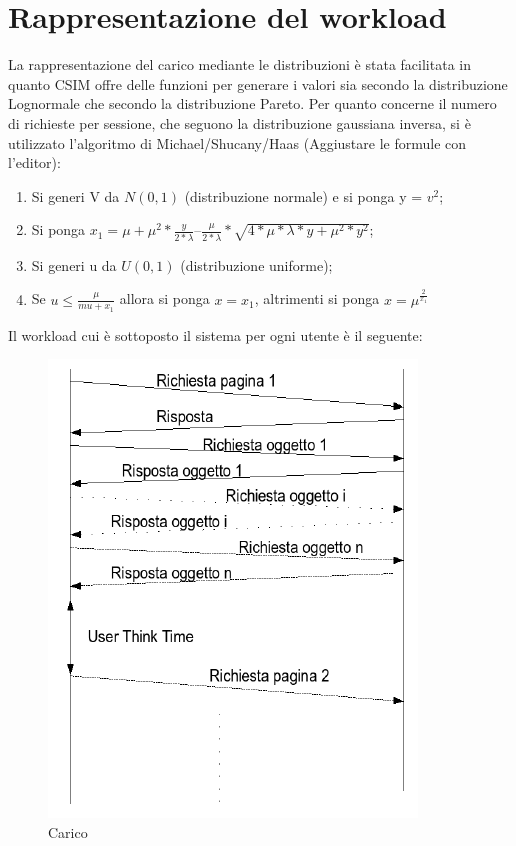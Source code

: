 \section{Rappresentazione del workload}
La rappresentazione del carico mediante le distribuzioni è stata facilitata in quanto CSIM offre delle funzioni per generare i valori sia secondo la distribuzione Lognormale  che secondo la distribuzione Pareto. Per quanto concerne il numero di richieste per sessione, che seguono la distribuzione gaussiana inversa, si è utilizzato l'algoritmo di Michael/Shucany/Haas (Aggiustare le formule con l'editor):
\begin{enumerate}
	\item Si generi V da $N(0,1)$ (distribuzione normale) e si ponga y = $v^{2}$;
	\item Si ponga $x_{1} =  \mu + \mu^{2}*\frac{y}{2*\lambda} – \frac{\mu}{2*\lambda} * \sqrt{4*\mu*\lambda*y+\mu^{2}*y^{2}}$;
	\item Si generi u da $U(0,1)$ (distribuzione uniforme);
	\item Se $u \leq \frac{\mu}{mu+x_{1}}$ allora si ponga $x = x_{1}$, altrimenti si ponga $x = \mu^{\frac{2}{x_{1}}}$
\end{enumerate}
Il workload cui è sottoposto il sistema per ogni utente è il seguente:
\begin{figure}[H]
\begin{center}
\includegraphics[scale=0.5]{etc/carico.png}
\caption{Carico}
\label{carico}
\end{center}
\end{figure}
